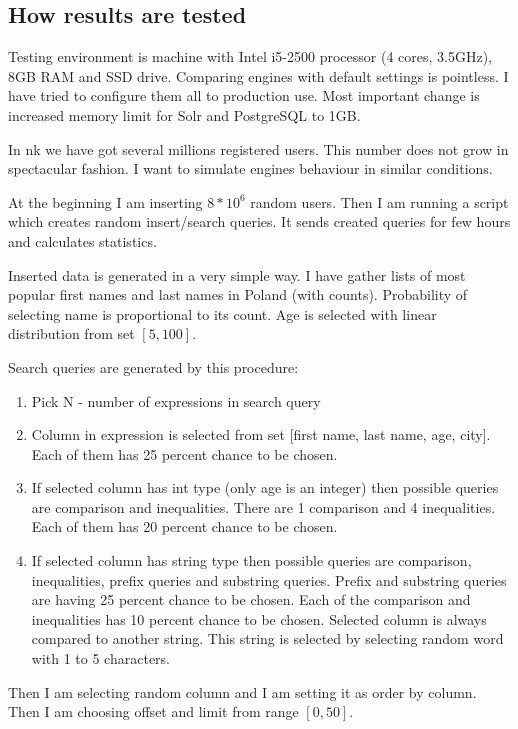 \documentclass[10pt,a4paper]{article}
\begin{document}
\subsection{How results are tested}

Testing environment is machine with Intel i5-2500 processor (4 cores, 3.5GHz), 8GB RAM and SSD drive. Comparing engines with default settings is pointless. I have tried to configure them all to production use. Most important change is increased memory limit for Solr and PostgreSQL to 1GB.

In nk we have got several millions registered users. This number does not grow in spectacular fashion. I want to simulate engines behaviour in similar conditions. 

At the beginning I am inserting $8 * 10^6$ random users. Then I am running a script which creates random insert/search queries. It sends created queries for few hours and calculates statistics.

Inserted data is generated in a very simple way. I have gather lists of most popular first names and last names in Poland (with counts). Probability of selecting name is proportional to its count. Age is selected with linear distribution from set $[5, 100]$.

Search queries are generated by this procedure:
\begin{enumerate}
\item Pick N - number of expressions in search query
\item Column in expression is selected from set [first name, last name, age, city]. Each of them has 25 percent chance to be chosen.
\item If selected column has int type (only age is an integer) then possible queries are comparison and inequalities. There are 1 comparison and 4 inequalities. Each of them has 20 percent chance to be chosen.
\item If selected column has string type then possible queries are comparison, inequalities, prefix queries and substring queries. Prefix and substring queries are having 25 percent chance to be chosen. Each of the comparison and inequalities has 10 percent chance to be chosen. Selected column is always compared to another string. This string is selected by selecting random word with 1 to 5 characters.
\end{enumerate}

Then I am selecting random column and I am setting it as order by column. Then I am choosing offset and limit from range $[0, 50]$.
\end{document}
